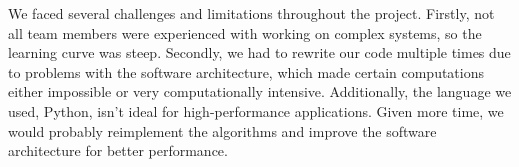 \documentclass{article}
\begin{document}
We faced several challenges and limitations throughout the project. Firstly, not all team members were experienced with working on complex systems, so the learning curve was steep. Secondly, we had to rewrite our code multiple times due to problems with the software architecture, which made certain computations either impossible or very computationally intensive. Additionally, the language we used, Python, isn't ideal for high-performance applications. Given more time, we would probably reimplement the algorithms and improve the software architecture for better performance.
\end{document}
